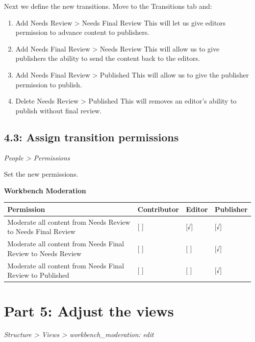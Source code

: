 \documentclass[letterpaper,10pt,english]{sphinxmanual}
\begin{document}
Next we define the new transitions. Move to the Transitions tab and:
\begin{enumerate}
\item {} 
Add Needs Review \textgreater{} Needs Final Review
This will let us give editors permission to advance content to publishers.

\item {} 
Add Needs Final Review \textgreater{} Needs Review
This will allow us to give publishers the ability to send the content back to the editors.

\item {} 
Add Needs Final Review \textgreater{} Published
This will allow us to give the publisher permission to publish.

\item {} 
Delete Needs Review \textgreater{} Published
This will removes an editor's ability to publish without final review.

\end{enumerate}


\subsection{4.3: Assign transition permissions}
\label{workbench:assign-transition-permissions}
\emph{People \textgreater{} Permissions}

Set the new permissions.

\textbf{Workbench Moderation}

\begin{tabulary}{\linewidth}{|L|L|L|L|}
\hline
\textbf{
Permission
} & \textbf{
Contributor
} & \textbf{
Editor
} & \textbf{
Publisher
}\\\hline

Moderate all content from Needs Review to Needs Final Review
 & 
{[} {]}
 & 
{[}√{]}
 & 
{[}√{]}
\\\hline

Moderate all content from Needs Final Review to Needs Review
 & 
{[} {]}
 & 
{[} {]}
 & 
{[}√{]}
\\\hline

Moderate all content from Needs Final Review to Published
 & 
{[} {]}
 & 
{[} {]}
 & 
{[}√{]}
\\\hline
\end{tabulary}



\section{Part 5: Adjust the views}
\label{workbench:part-5-adjust-the-views}
\emph{Structure \textgreater{} Views \textgreater{} workbench\_moderation: edit}
\end{document}
